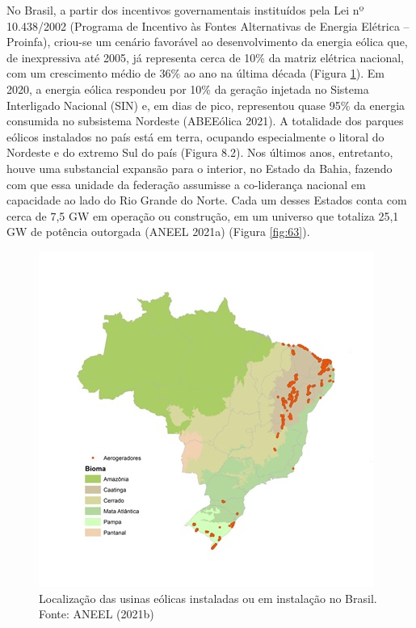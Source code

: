 \documentclass[
  oneside]{scrbook}
\begin{document}
No Brasil, a partir dos incentivos governamentais instituídos pela Lei nº 10.438/2002 (Programa de Incentivo às Fontes Alternativas de Energia Elétrica -- Proinfa), criou-se um cenário favorável ao desenvolvimento da energia eólica que, de inexpressiva até 2005, já representa cerca de 10\% da matriz elétrica nacional, com um crescimento médio de 36\% ao ano na última década (Figura \ref{fig:62}). Em 2020, a energia eólica respondeu por 10\% da geração injetada no Sistema Interligado Nacional (SIN) e, em dias de pico, representou quase 95\% da energia consumida no subsistema Nordeste (ABEEólica 2021). A totalidade dos parques eólicos instalados no país está em terra, ocupando especialmente o litoral do Nordeste e do extremo Sul do país (Figura 8.2). Nos últimos anos, entretanto, houve uma substancial expansão para o interior, no Estado da Bahia, fazendo com que essa unidade da federação assumisse a co-liderança nacional em capacidade ao lado do Rio Grande do Norte. Cada um desses Estados conta com cerca de 7,5 GW em operação ou construção, em um universo que totaliza 25,1 GW de potência outorgada (ANEEL 2021a) (Figura \ref{fig:63}).

\begin{figure}[H]

{\centering \includegraphics[width=0.55\linewidth]{imagens/cap08/Figura_8.2} 

}

\caption{Localização das usinas eólicas instaladas ou em instalação no Brasil. Fonte: ANEEL (2021b)}\label{fig:62}
\end{figure}
\end{document}
